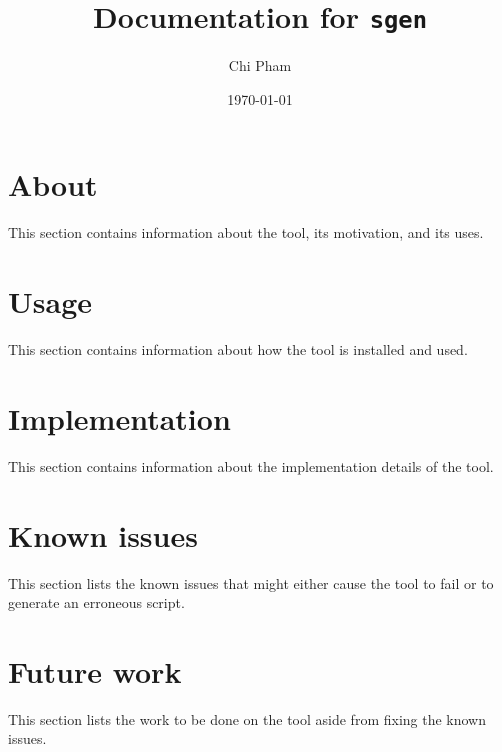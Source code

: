 \documentclass[a4paper,11pt]{article}
\title{\textbf{Documentation for \texttt{sgen}}}
\date{\today}
\author{Chi Pham}
\begin{document}
\maketitle
\tableofcontents
\newpage

\section{About}
This section contains information about the tool, its motivation, and its uses.

\clearpage

\section{Usage}
This section contains information about how the tool is installed and used.

\clearpage

\section{Implementation}
This section contains information about the implementation details of the tool.

\clearpage

\section{Known issues}
This section lists the known issues that might either cause the tool to fail or to generate an erroneous script.

\clearpage

\section{Future work}
This section lists the work to be done on the tool aside from fixing the known issues.

\end{document}
